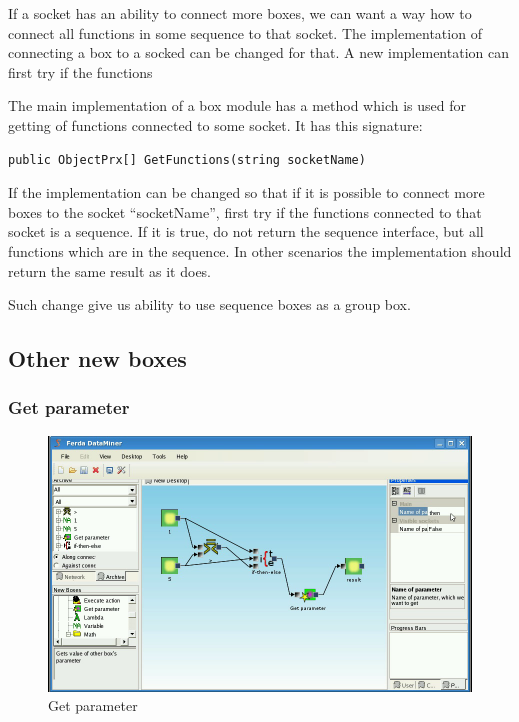 \documentclass[a4paper,12pt]{book}
\begin{document}
If a socket has an ability to connect more boxes, we can want a way how to connect all functions in some sequence to that socket. The implementation of connecting a box to a socked can be changed for that. A new implementation can first try if the functions 

The main implementation of a box module has a method which is used for getting of functions connected to some socket. It has this signature:
\begin{verbatim}
public ObjectPrx[] GetFunctions(string socketName)
\end{verbatim}

If the implementation can be changed so that if it is possible to connect more boxes to the socket ``socketName'', first try if the functions connected to that socket is a sequence. If it is true, do not return the sequence interface, but all functions which are in the sequence. In other scenarios the implementation should return the same result as it does.

Such change give us ability to use sequence boxes as a group box.

\subsection{Other new boxes}
\subsubsection{Get parameter}
\begin{figure}
\includegraphics[width=13.72cm]{getParameter2.png}
	\caption{Get parameter}
\end{figure}
\end{document}

